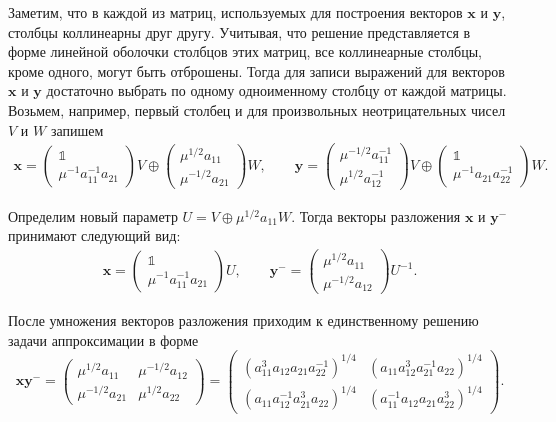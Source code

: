 \documentclass[specialist,
               substylefile = spbu.rtx,
               subf,href,colorlinks=true, 12pt]{disser}
\theoremstyle{definition}
\begin{document}
Заметим, что в каждой из матриц, используемых для построения векторов $\bm{x}$ и $\bm{y}$, столбцы коллинеарны друг другу. 
Учитывая, что решение представляется в форме линейной оболочки столбцов этих матриц, все коллинеарные столбцы, кроме одного, могут быть отброшены. Тогда для записи выражений для векторов $\bm{x}$ и $\bm{y}$ достаточно выбрать по одному одноименному столбцу от каждой матрицы. Возьмем, например, первый столбец и для произвольных неотрицательных чисел $V$ и $W$ запишем
\begin{align*}
\bm{x}
=
\begin{pmatrix}
\mathbb{1}
\\
\mu^{-1}a_{11}^{-1}a_{21}
\end{pmatrix}
V
\oplus
\begin{pmatrix}
\mu^{1/2} a_{11}
\\
\mu^{-1/2}a_{21}
\end{pmatrix}
W,
\qquad
\bm{y}
=
\begin{pmatrix}
\mu^{-1/2}a_{11}^{-1}
\\
\mu^{1/2} a_{12}^{-1}
\end{pmatrix}
V
\oplus
\begin{pmatrix}
\mathbb{1}
\\
\mu^{-1}a_{21}a_{22}^{-1}
\end{pmatrix}
W.
\end{align*}

Определим новый параметр $U=V\oplus\mu^{1/2}a_{11}W$. Тогда векторы разложения $\bm{x}$ и $\bm{y}^{-}$ принимают следующий вид:
\begin{equation*}
\begin{aligned}
\bm{x}
=
\begin{pmatrix}
\mathbb{1}
\\
\mu^{-1}a_{11}^{-1}a_{21}
\end{pmatrix}
U,
\qquad
\bm{y}^{-}
=
\begin{pmatrix}
\mu^{1/2} a_{11}
\\
\mu^{-1/2}a_{12}
\end{pmatrix}
U^{-1}.
\end{aligned}
\end{equation*}

После умножения векторов разложения приходим к единственному решению задачи аппроксимации в форме
\begin{equation*}
\bm{x}\bm{y}^{-}
=
\begin{pmatrix}
\mu^{1/2} a_{11} &\mu^{-1/2}a_{12}
\\
\mu^{-1/2}a_{21} &\mu^{1/2} a_{22}
\end{pmatrix}
=
\begin{pmatrix}
(a_{11}^{3}a_{12}a_{21}a_{22}^{-1})^{1/4} &(a_{11}a_{12}^{3}a_{21}^{-1}a_{22})^{1/4}
\\
(a_{11}a_{12}^{-1}a_{21}^{3}a_{22})^{1/4} &(a_{11}^{-1}a_{12}a_{21}a_{22}^{3})^{1/4}
\end{pmatrix}.
\end{equation*}
\end{document}

